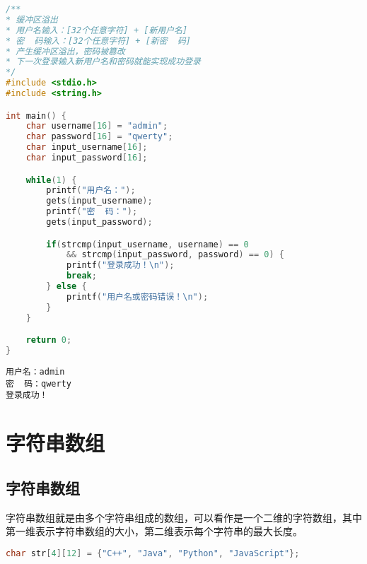 \vspace{0.5cm}


\begin{lstlisting}[language=C]
/**
* 缓冲区溢出
* 用户名输入：[32个任意字符] + [新用户名]
* 密  码输入：[32个任意字符] + [新密  码]
* 产生缓冲区溢出，密码被篡改
* 下一次登录输入新用户名和密码就能实现成功登录
*/
#include <stdio.h>
#include <string.h>

int main() {
	char username[16] = "admin";
	char password[16] = "qwerty";
	char input_username[16];
	char input_password[16];

	while(1) {
		printf("用户名：");
		gets(input_username);
		printf("密  码：");
		gets(input_password);

		if(strcmp(input_username, username) == 0
			&& strcmp(input_password, password) == 0) {
			printf("登录成功！\n");
			break;
		} else {
			printf("用户名或密码错误！\n");
		}
	}

	return 0;
}
\end{lstlisting}

\begin{tcolorbox}
	\begin{verbatim}
用户名：admin
密  码：qwerty
登录成功！
	\end{verbatim}
\end{tcolorbox}

\newpage

\section{字符串数组}

\subsection{字符串数组}

字符串数组就是由多个字符串组成的数组，可以看作是一个二维的字符数组，其中第一维表示字符串数组的大小，第二维表示每个字符串的最大长度。

\vspace{-0.5cm}

\begin{lstlisting}[language=C]
char str[4][12] = {"C++", "Java", "Python", "JavaScript"};
\end{lstlisting}

